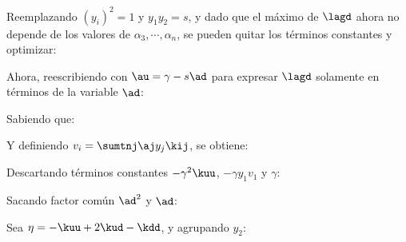 Reemplazando $(y_i)^2=1$ y $y_1 y_2 = s$,  y dado que el máximo de  $\lagd$ ahora no depende de los valores de  $\alpha_3,\cdots,\alpha_n$, se pueden quitar los términos constantes y optimizar:



Ahora, reescribiendo con $\au=\gamma-s \ad$ para expresar $\lagd$ solamente en términos de la variable $\ad$:


Sabiendo que:


Y definiendo $v_i = \sumtnj	 \aj y_j \kij$, se obtiene:


Descartando términos constantes $- \gamma^2  \kuu $, $- \gamma y_1 v_1$ y $\gamma$:





Sacando factor común $\ad^2$ y $\ad$:

Sea $\eta = -\kuu +  2 \kud - \kdd$, y agrupando $y_2$:


